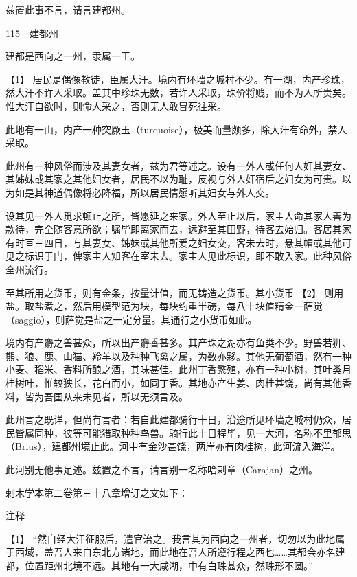\documentclass[12pt,UTF8]{ctexbook}
\begin{document}
兹置此事不言，请言建都州。





115　建都州

建都是西向之一州，隶属一王。





【1】 居民是偶像教徒，臣属大汗。境内有环墙之城村不少。有一湖，内产珍珠，然大汗不许人采取。盖其中珍珠无数，若许人采取，珠价将贱，而不为人所贵矣。惟大汗自欲时，则命人采之，否则无人敢冒死往采。

此地有一山，内产一种突厥玉（turquoise），极美而量颇多，除大汗有命外，禁人采取。

此州有一种风俗而涉及其妻女者，兹为君等述之。设有一外人或任何人奸其妻女、其姊妹或其家之其他妇女者，居民不以为耻，反视与外人奸宿后之妇女为可贵。以为如是其神道偶像将必降福，所以居民情愿听其妇女与外人交。

设其见一外人觅求顿止之所，皆愿延之来家。外人至止以后，家主人命其家人善为款待，完全随客意所欲；嘱毕即离家而去，远避至其田野，待客去始归。客居其家有时亘三四日，与其妻女、姊妹或其他所爱之妇女交，客未去时，悬其帽或其他可见之标识于门，俾家主人知客在室未去。家主人见此标识，即不敢入家。此种风俗全州流行。

至其所用之货币，则有金条，按量计值，而无铸造之货币。其小货币 【2】 则用盐。取盐煮之，然后用模型范为块，每块约重半磅，每八十块值精金一萨觉（saggio），则萨觉是盐之一定分量。其通行之小货币如此。

境内有产麝之兽甚众，所以出产麝香甚多。其产珠之湖亦有鱼类不少。野兽若狮、熊、狼、鹿、山猫、羚羊以及种种飞禽之属，为数亦夥。其他无葡萄酒，然有一种小麦、稻米、香料所酿之酒，其味甚佳。此州丁香繁殖，亦有一种小树，其叶类月桂树叶，惟较狭长，花白而小，如同丁香。其地亦产生姜、肉桂甚饶，尚有其他香料，皆为吾国从来未见者，所以无须言及。

此州言之既详，但尚有言者：若自此建都骑行十日，沿途所见环墙之城村仍众，居民皆属同种，彼等可能猎取种种鸟兽。骑行此十日程毕，见一大河，名称不里郁思（Brius），建都州境止此。河中有金沙甚饶，两岸亦有肉桂树，此河流入海洋。

此河别无他事足述。兹置之不言，请言别一名称哈剌章（Carajan）之州。

剌木学本第二卷第三十八章增订之文如下：

注释

【1】 “然自经大汗征服后，遣官治之。我言其为西向之一州者，切勿以为此地属于西域，盖吾人来自东北方诸地，而此地在吾人所遵行程之西也……其都会亦名建都，位置距州北境不远。其地有一大咸湖，中有白珠甚众，然珠形不圆。”
\end{document}

